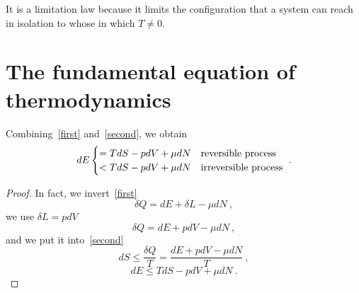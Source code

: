     It is a limitation law because it limits the configuration that a system can reach in isolation to whose in which $T \neq 0$.

\section{The fundamental equation of thermodynamics}

    Combining~\eqref{first} and~\eqref{second}, we obtain 
    \begin{equation}\label{de}
        dE \begin{cases}
            = T dS - pdV + \mu dN & \textnormal{reversible process} \\
            < T dS - pdV + \mu dN & \textnormal{irreversible process} \\
        \end{cases} ~.
    \end{equation}
    \begin{proof}
        In fact, we invert~\eqref{first}
        \begin{equation*}
            \delta Q = dE + \delta L - \mu dN ~,
        \end{equation*}
        we use $\delta L = p dV$ 
        \begin{equation*}
            \delta Q = dE + p dV - \mu dN ~,
        \end{equation*}
        and we put it into~\eqref{second}
        \begin{equation}
            dS \leq \frac{\delta Q}{T} = \frac{dE + p dV - \mu dN}{T} ~,
        \end{equation}
        \begin{equation}
            dE \leq TdS - p dV + \mu dN ~.
        \end{equation}
    \end{proof} 

